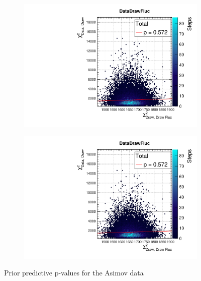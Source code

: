 \begin{figure}[!h]
	\begin{subfigure}[t]{0.49\textwidth}
		\includegraphics[width=\textwidth, trim={0mm 0mm 0mm 11mm}, clip,page=1]{figures/mach3/Asimov/2017b_NewDet_3Xsec_4Det_5Flux_NewXSecTune_Asimov_merge_PriorPred_procs}
	\end{subfigure}
	\begin{subfigure}[t]{0.49\textwidth}
		\includegraphics[width=\textwidth, trim={0mm 0mm 0mm 11mm}, clip,page=2]{figures/mach3/Asimov/2017b_NewDet_3Xsec_4Det_5Flux_NewXSecTune_Asimov_merge_PriorPred_procs}
	\end{subfigure}
\caption{Prior predictive p-values for the Asimov data}
\label{fig:prior_predictive_asimov}
\end{figure}

